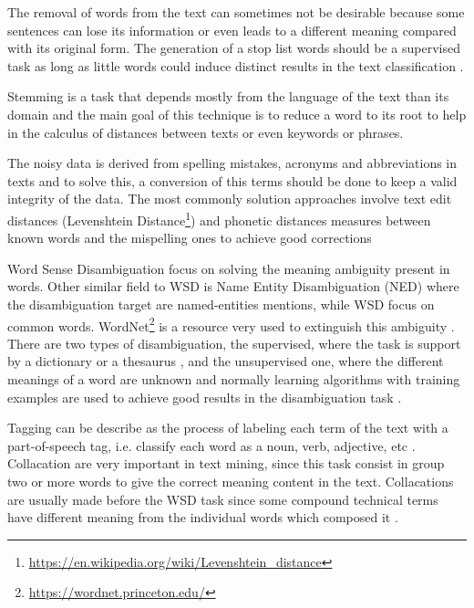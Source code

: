 The removal of words from the text can sometimes not be desirable because some sentences can lose its information or even leads to a different meaning compared with its original form. The generation of a stop list words should be a supervised task as long as little words could induce distinct results in the text classification \cite{kn:Riloff1995}.

Stemming is a task that depends mostly from the language of the text than its domain \cite{kn:Stavrianou2007} and the main goal of this technique is to reduce a word to its root to help in the calculus of distances between texts or even keywords or phrases.

The noisy data is derived from spelling mistakes, acronyms and abbreviations in texts and to solve this, a conversion of this terms should be done to keep a valid integrity of the data. The most commonly solution approaches involve text edit distances (Levenshtein Distance\footnote{\url{https://en.wikipedia.org/wiki/Levenshtein_distance}}) and phonetic distances measures between known words and the mispelling ones to achieve good corrections \cite{kn:Bontcheva2013} 

Word Sense Disambiguation focus on solving the meaning ambiguity present in words. Other similar field to WSD is Name Entity Disambiguation (NED) where the disambiguation target are named-entities mentions, while WSD focus on common words. WordNet\footnote{\url{https://wordnet.princeton.edu/}} is a resource very used to extinguish this ambiguity \cite{kn:Chang2016}. There are two types of disambiguation, the supervised, where the task is support by a dictionary or a thesaurus \cite{kn:Stavrianou2007}, and the unsupervised one, where the different meanings of a word are unknown and normally learning algorithms with training examples are used to achieve good results in the disambiguation task \cite{kn:Yarowsky1995}.

Tagging can be describe as the process of labeling each term of the text with a part-of-speech tag, i.e. classify each word as a noun, verb, adjective, etc \cite{kn:Hotho2005}. Collacation are very important in text mining, since this task consist in group two or more words to give the correct meaning content in the text. Collacations are usually made before the WSD task since some compound technical terms have different meaning from the individual words which composed it \cite{kn:Stavrianou2007}.

